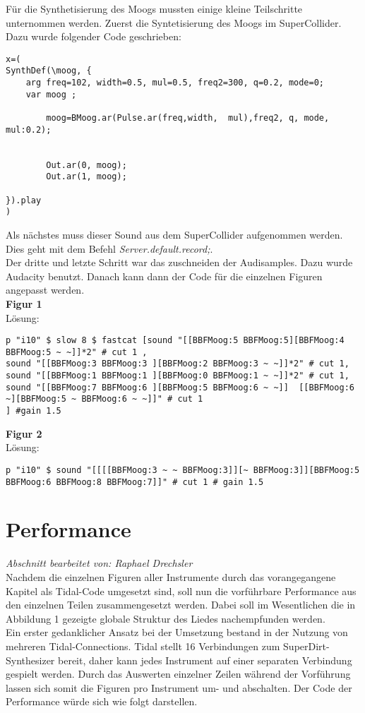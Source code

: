 \documentclass[
10pt, %
a4paper, %
oneside, %
headinclude,footinclude, %
BCOR5mm, %
]{scrartcl}
\begin{document}
Für die Synthetisierung des Moogs mussten einige kleine Teilschritte unternommen werden. Zuerst die Syntetisierung des Moogs im SuperCollider.\\
Dazu wurde folgender Code geschrieben:
\begin{lstlisting}
x=(
SynthDef(\moog, {
	arg freq=102, width=0.5, mul=0.5, freq2=300, q=0.2, mode=0;
	var moog ;
	
		moog=BMoog.ar(Pulse.ar(freq,width,  mul),freq2, q, mode, mul:0.2);
		
		
		Out.ar(0, moog);
		Out.ar(1, moog);
	
}).play
)
\end{lstlisting}
Als nächstes muss dieser Sound aus dem SuperCollider aufgenommen werden. Dies geht mit dem Befehl \textit{Server.default.record;}.\\
Der dritte und letzte Schritt war das zuschneiden der Audisamples. Dazu wurde Audacity benutzt. Danach kann dann der Code für die einzelnen Figuren angepasst werden.\\
\noindent\textbf{Figur 1}\\
Lösung:\\
\begin{lstlisting}
p "i10" $ slow 8 $ fastcat [sound "[[BBFMoog:5 BBFMoog:5][BBFMoog:4 BBFMoog:5 ~ ~]]*2" # cut 1 ,
sound "[[BBFMoog:3 BBFMoog:3 ][BBFMoog:2 BBFMoog:3 ~ ~]]*2" # cut 1,
sound "[[BBFMoog:1 BBFMoog:1 ][BBFMoog:0 BBFMoog:1 ~ ~]]*2" # cut 1,
sound "[[BBFMoog:7 BBFMoog:6 ][BBFMoog:5 BBFMoog:6 ~ ~]]  [[BBFMoog:6 ~][BBFMoog:5 ~ BBFMoog:6 ~ ~]]" # cut 1
] #gain 1.5
\end{lstlisting}
\noindent\textbf{Figur 2}\\
Lösung:\\
\begin{lstlisting}
p "i10" $ sound "[[[[BBFMoog:3 ~ ~ BBFMoog:3]][~ BBFMoog:3]][BBFMoog:5 BBFMoog:6 BBFMoog:8 BBFMoog:7]]" # cut 1 # gain 1.5
\end{lstlisting}

\section{Performance}
\textit{Abschnitt bearbeitet von: Raphael Drechsler}\\

\noindent Nachdem die einzelnen Figuren aller Instrumente durch das vorangegangene Kapitel als Tidal-Code umgesetzt sind, soll nun die vorführbare Performance aus den einzelnen Teilen zusammengesetzt werden. Dabei soll im Wesentlichen die in Abbildung 1 gezeigte globale Struktur des Liedes nachempfunden werden.\\
Ein erster gedanklicher Ansatz bei der Umsetzung bestand in der Nutzung von mehreren Tidal-Connections. Tidal stellt 16 Verbindungen zum SuperDirt-Synthesizer bereit\cite{tid14}, daher kann jedes Instrument auf einer separaten Verbindung gespielt werden. Durch das Auswerten einzelner Zeilen während der Vorführung lassen sich somit die Figuren pro Instrument um- und abschalten. Der Code der Performance würde sich wie folgt darstellen.
\end{document}
